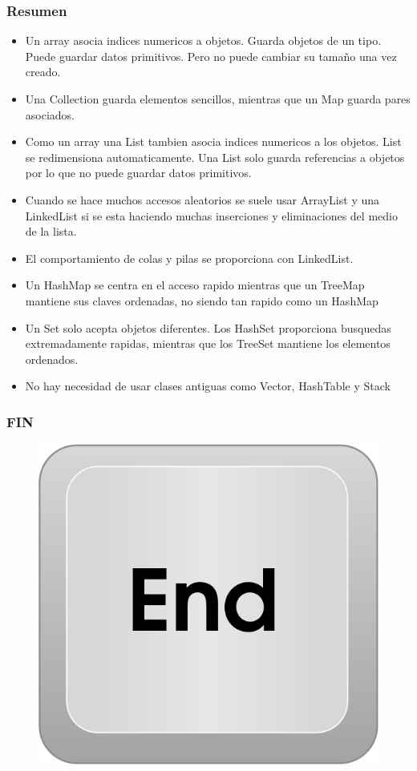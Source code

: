 \documentclass{beamer}
\begin{document}
\begin{frame}
\frametitle{Resumen}
\begin{footnotesize}
\begin{itemize}[<+->]
\item Un \alert{array} asocia indices numericos a objetos. Guarda objetos de un tipo. Puede guardar datos primitivos. Pero no puede cambiar su tamaño una vez creado.
\item Una \alert{Collection} guarda elementos sencillos, mientras que un \alert{Map} guarda pares asociados.
\item Como un \alert{array} una \alert{List} tambien asocia indices numericos a los objetos. \alert{List} se redimensiona automaticamente. Una \alert{List} solo guarda referencias a objetos por lo que no puede guardar datos primitivos.  
\item Cuando se hace muchos accesos aleatorios se suele usar \alert{ArrayList} y una \alert{LinkedList} si se esta haciendo muchas inserciones y eliminaciones del medio de la lista.
\item El comportamiento de colas y pilas se proporciona con \alert{LinkedList}.
\item Un \alert{HashMap} se centra en el acceso rapido mientras que un \alert{TreeMap} mantiene sus claves ordenadas, no siendo tan rapido como un \alert{HashMap}
\item Un \alert{Set} solo acepta objetos diferentes. Los \alert{HashSet} proporciona busquedas extremadamente rapidas, mientras que los \alert{TreeSet} mantiene los elementos ordenados.
\item No hay necesidad de usar clases antiguas como \alert{Vector}, \alert{HashTable} y \alert{Stack}
\end{itemize}
\end{footnotesize}
\end{frame}

\begin{frame}
\frametitle{FIN}
\begin{figure}
\includegraphics[scale=0.4]{imagenes/end.png}
\end{figure}
\end{frame}
\end{document}

